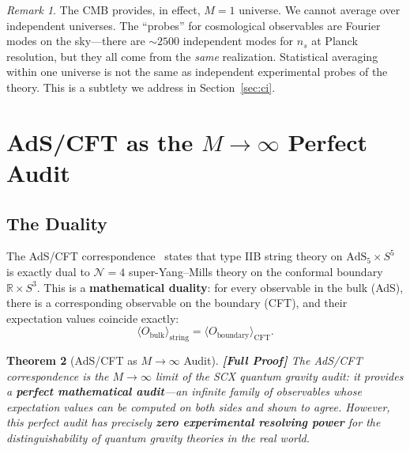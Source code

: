 \documentclass[12pt,a4paper]{article}
\newcommand{\braket}[1]{\langle #1 \rangle}
\newtheorem{theorem}{Theorem}[section]
\theoremstyle{remark}
\newtheorem{remark}[theorem]{Remark}
\newcommand{\R}{\mathbb{R}}
\newcommand{\rigorFull}{\textbf{[Full Proof]}}
\begin{document}
\begin{remark}
\label{rem:cmb_single_probe}
The CMB provides, in effect, $M = 1$ universe. We cannot average over independent universes. The ``probes'' for cosmological observables are Fourier modes on the sky---there are $\sim 2500$ independent modes for $n_s$ at Planck resolution, but they all come from the \emph{same} realization. Statistical averaging within one universe is not the same as independent experimental probes of the theory. This is a subtlety we address in Section~\ref{sec:ci}.
\end{remark}


\section{AdS/CFT as the $M \to \infty$ Perfect Audit}
\label{sec:adscft}

\subsection{The Duality}

The AdS/CFT correspondence~\cite{maldacena1999large} states that type IIB string theory on $\text{AdS}_5 \times S^5$ is exactly dual to $\mathcal{N} = 4$ super-Yang--Mills theory on the conformal boundary $\R \times S^3$. This is a \textbf{mathematical duality}: for every observable in the bulk (AdS), there is a corresponding observable on the boundary (CFT), and their expectation values coincide exactly:
\begin{equation}
  \label{eq:adscft_exact}
  \braket{O_{\text{bulk}}}_{\text{string}} = \braket{O_{\text{boundary}}}_{\text{CFT}}.
\end{equation}

\begin{theorem}[AdS/CFT as $M \to \infty$ Audit]
\label{thm:adscft_audit}
\rigorFull
The AdS/CFT correspondence is the $M \to \infty$ limit of the SCX quantum gravity audit: it provides a \textbf{perfect mathematical audit}---an infinite family of observables whose expectation values can be computed on both sides and shown to agree. However, this perfect audit has precisely \textbf{zero experimental resolving power} for the distinguishability of quantum gravity theories in the real world.
\end{theorem}
\end{document}
